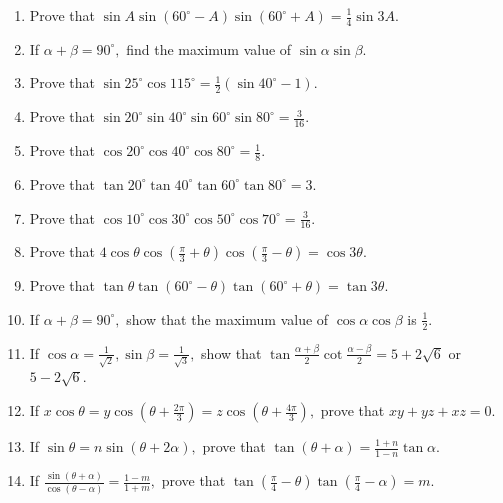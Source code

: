 \begin{enumerate}[resume]
\item Prove that $\sin A\sin(60^\circ - A)\sin(60^\circ + A) = \frac{1}{4}\sin 3A$.

\item If $\alpha + \beta = 90^\circ,$ find the maximum value of $\sin\alpha\sin\beta$.

\item Prove that $\sin 25^\circ\cos 115^\circ = \frac{1}{2}(\sin 40^\circ - 1)$.

\item Prove that $\sin 20^\circ \sin 40^\circ\sin 60^\circ \sin80^\circ = \frac{3}{16}$.

\item Prove that $\cos 20^\circ\cos40^\circ\cos80^\circ = \frac{1}{8}$.

\item Prove that $\tan20^\circ\tan40^\circ\tan60^\circ\tan80^\circ = 3$.

\item Prove that $\cos10^\circ\cos30^\circ\cos50^\circ\cos70^\circ = \frac{3}{16}$.

\item Prove that $4\cos\theta\cos\left(\frac{\pi}{3} + \theta\right)\cos\left(\frac{\pi}{3} - \theta\right) = \cos3\theta$.

\item Prove that $\tan\theta\tan(60^\circ - \theta)\tan(60^\circ + \theta) = \tan3\theta$.

\item If $\alpha + \beta = 90^\circ,$ show that the maximum value of $\cos\alpha\cos\beta$ is $\frac{1}{2}$.

\item If $\cos\alpha = \frac{1}{\sqrt{2}}, \sin\beta = \frac{1}{\sqrt{3}},$ show that $\tan\frac{\alpha +
    \beta}{2}\cot\frac{\alpha - \beta}{2} = 5 + 2\sqrt{6}$ or $5- 2\sqrt{6 }$.

\item If $x\cos\theta = y\cos\left(\theta + \frac{2\pi}{3}\right) = z\cos\left(\theta + \frac{4\pi}{3}\right),$ prove that
    $xy + yz + xz = 0$.

\item If $\sin\theta = n\sin(\theta + 2\alpha),$ prove that $\tan(\theta + \alpha) = \frac{1 + n}{1 - n}\tan\alpha$.

\item If $\frac{\sin(\theta + \alpha)}{\cos(\theta - \alpha)} = \frac{1 - m}{1 + m},$ prove that $\tan\left(\frac{\pi}{4}
    - \theta\right)\tan\left(\frac{\pi}{4} - \alpha\right) = m$.


\end{enumerate}
